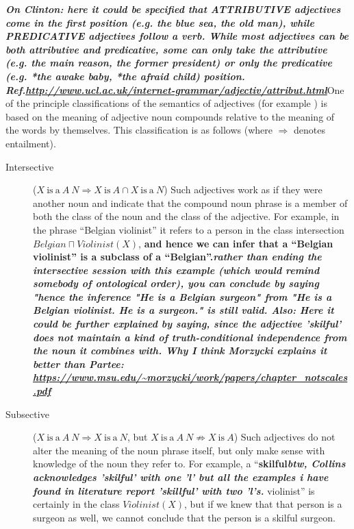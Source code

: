 \documentclass[11pt]{article}
\begin{document}
\textbf{\textit{On Clinton: here it could be specified that ATTRIBUTIVE adjectives come in the first position (e.g. the blue sea, the old man), while PREDICATIVE adjectives follow a verb. While most adjectives can be both attributive and predicative, some can only take the attributive (e.g. the main reason, the former president) or only the predicative (e.g. *the awake baby, *the afraid child) position. 
Ref.\url{http://www.ucl.ac.uk/internet-grammar/adjectiv/attribut.html}}}One of the principle classifications of the semantics of adjectives (for example \cite{partee2003there,bouillon1999description}) is based on the meaning of adjective noun compounds relative to the meaning of the words by themselves. This classification is as follows (where $\Rightarrow$ denotes entailment).

\begin{description}
\item[Intersective] ($X\mathrm{~is~a~}A~N \Rightarrow X\mathrm{~is~}A \cap X\mathrm{~is~a~}N$) 
Such adjectives work as if they were another noun and indicate that the compound 
noun phrase is a member of both the class of the noun and the class of the 
adjective. For example, in the phrase ``Belgian violinist'' it refers to a 
person in the class intersection $Belgian \sqcap Violinist(X)$, \textbf{and hence we 
can infer that a ``Belgian violinist'' is a subclass of a ``Belgian''.\textit{rather than ending the intersective session with this example (which would remind somebody of ontological order), you can conclude by saying "hence the inference "He is a Belgian surgeon" from "He is a Belgian violinist. He is a surgeon." is still valid.  Also: Here it could be further explained by saying, since the adjective 'skilful' does not maintain a kind of truth-conditional independence from the noun it combines with. 
Why I think Morzycki explains it better than Partee: \url{https://www.msu.edu/~morzycki/work/papers/chapter_notscales.pdf}}}
\item[Subsective] ($X\mathrm{~is~a~}A~N \Rightarrow X\mathrm{~is~a~}N$, but $X\mathrm{~is~a~}A~N \not\Rightarrow X\mathrm{~is~}A$) 
Such adjectives do not alter the meaning of the noun phrase itself, but only 
make sense with knowledge of the noun they refer to. For example, a ``\textbf{skilful\textit{btw, Collins acknowledges 'skilful' with one 'l' but all the examples i have found in literature report 'skillful' with two 'l's.}}
violinist'' is certainly in the class $Violinist(X)$, but if we knew that that 
person is a surgeon as well, we cannot conclude that the person is a skilful surgeon. 

\end{description}
\end{document}
